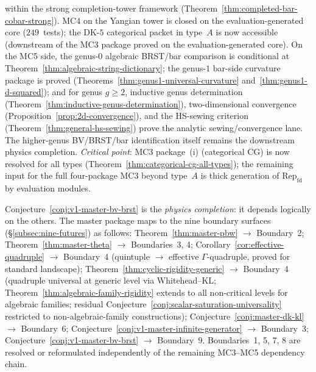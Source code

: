 \begin{remark}
within the strong completion-tower framework
(Theorem~\ref{thm:completed-bar-cobar-strong}). MC4 on the
Yangian tower is closed on the evaluation-generated core ($249$~tests);
the DK-$5$ categorical packet in type~$A$ is now accessible
(downstream of the MC3 package proved on the evaluation-generated core).
On the MC5 side, the genus-$0$ algebraic BRST/bar comparison is
conditional at Theorem~\ref{thm:algebraic-string-dictionary};
the genus-$1$ bar-side curvature package is proved
\textup{(}Theorems~\ref{thm:genus1-universal-curvature}
and~\ref{thm:genus1-d-squared}\textup{)}; and for
genus $g \ge 2$, inductive genus determination
(Theorem~\ref{thm:inductive-genus-determination}),
two-dimensional convergence
(Proposition~\ref{prop:2d-convergence}),
and the HS-sewing criterion
(Theorem~\ref{thm:general-hs-sewing}) prove the analytic
sewing/convergence lane. The higher-genus BV/BRST/bar
identification itself remains the downstream physics completion.
\emph{Critical point}: MC3 package~(i) (categorical CG) is now
resolved for all types
(Theorem~\ref{thm:categorical-cg-all-types}); the remaining
input for the full four-package MC3 beyond type~$A$ is thick
generation of $\mathrm{Rep}_{\mathrm{fd}}$ by evaluation modules.

Conjecture~\ref{conj:v1-master-bv-brst} is the
\emph{physics completion}: it depends logically on the others.
The master package maps to the nine boundary surfaces
(\S\ref{subsec:nine-futures}) as follows:
Theorem~\ref{thm:master-pbw} $\to$ Boundary~2;
Theorem~\ref{thm:master-theta} $\to$ Boundaries~3, 4;
Corollary~\ref{cor:effective-quadruple} $\to$ Boundary~4
(quintuple $\to$ effective $\Gamma$-quadruple, proved for standard landscape);
Theorem~\ref{thm:cyclic-rigidity-generic} $\to$ Boundary~4
(quadruple universal at generic level via Whitehead--KL;
Theorem~\ref{thm:algebraic-family-rigidity} extends
to all non-critical levels for algebraic families;
residual Conjecture~\ref{conj:scalar-saturation-universality}
restricted to non-algebraic-family constructions);
Conjecture~\ref{conj:master-dk-kl} $\to$ Boundary~6;
Conjecture~\ref{conj:v1-master-infinite-generator} $\to$ Boundary~3;
Conjecture~\ref{conj:v1-master-bv-brst} $\to$ Boundary~9.
Boundaries~1, 5, 7, 8 are resolved or reformulated independently of the
remaining MC3--MC5 dependency chain.
\end{remark}

